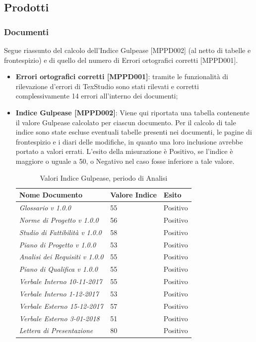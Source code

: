 \documentclass[openany,12pt,a4paper]{report}
\begin{document}
\subsection{Prodotti}

\subsubsection{Documenti}

Segue riassunto del calcolo dell'Indice Gulpease [MPPD002] (al netto di tabelle e frontespizio) e di quello del numero di Errori ortografici corretti [MPPD001].

\begin{itemize}
	\item \textbf{Errori ortografici corretti [MPPD001]}: tramite le funzionalità di rilevazione d'errori di TexStudio sono stati rilevati e corretti complessivamente 14 errori all'interno dei documenti;
	
	\item \textbf{Indice Gulpease [MPPD002]}: Viene qui riportata una tabella contenente il valore Gulpease calcolato per ciascun documento.
	Per il calcolo di tale indice sono state escluse eventuali tabelle presenti nei documenti, le pagine di frontespizio e i diari delle modifiche, in quanto una loro inclusione avrebbe portato a valori errati. L'esito della misurazione è Positivo, se l'indice è maggiore o uguale a 50, o Negativo nel caso fosse inferiore a tale valore.
	
	\begin{table}[h]
		\begin{center}
			\setlength\LTleft{6mm}
			\begin{longtable}{|p{60mm}|p{30mm}|p{25mm}|}
				\hline  
				\textbf{Nome Documento} & \textbf{Valore Indice} & \textbf{Esito} \\ \hline    
				\textit{Glossario v 1.0.0} & 55 & Positivo\\ \hline    
				\textit{Norme di Progetto v 1.0.0} & 56 & Positivo\\ \hline    
				\textit{Studio di Fattibilità v 1.0.0} & 58 & Positivo\\ \hline    
				\textit{Piano di Progetto v 1.0.0} & 53 & Positivo\\ \hline    
				\textit{Analisi dei Requisiti v 1.0.0} & 55 & Positivo\\ \hline    
				\textit{Piano di Qualifica v 1.0.0} & 55 & Positivo\\ \hline    
				\textit{Verbale Interno 10-11-2017} & 55 & Positivo\\ \hline    
				\textit{Verbale Interno 1-12-2017} & 53 & Positivo\\ \hline    
				\textit{Verbale Esterno 15-12-2017} & 57 & Positivo\\ \hline    
				\textit{Verbale Esterno 3-01-2018} & 51 & Positivo\\ \hline   
				\textit{Lettera di Presentazione} & 80 & Positivo\\ \hline
			\end{longtable}
		\end{center}
		\caption{Valori Indice Gulpease, periodo di Analisi} 
	\end{table} 


\end{itemize}
\end{document}
